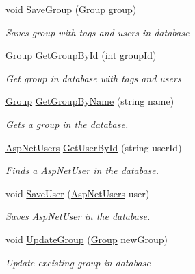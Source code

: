 \begin{DoxyCompactItemize}
void \hyperlink{class_website_1_1_models_1_1_quiz_model_acc5d338877e7da2f1f93008ba8d2e164}{Save\+Group} (\hyperlink{class_website_1_1_models_1_1_group}{Group} group)
\begin{DoxyCompactList}\small\item\em Saves group with tags and users in database \end{DoxyCompactList}\item 
\hyperlink{class_website_1_1_models_1_1_group}{Group} \hyperlink{class_website_1_1_models_1_1_quiz_model_a49fa02218c1a66bb6aaf0980fefffbc4}{Get\+Group\+By\+Id} (int group\+Id)
\begin{DoxyCompactList}\small\item\em Get group in database with tags and users \end{DoxyCompactList}\item 
\hyperlink{class_website_1_1_models_1_1_group}{Group} \hyperlink{class_website_1_1_models_1_1_quiz_model_a8ae086ab69c5576bb5b9963221d03d4c}{Get\+Group\+By\+Name} (string name)
\begin{DoxyCompactList}\small\item\em Gets a group in the database. \end{DoxyCompactList}\item 
\hyperlink{class_website_1_1_asp_net_users}{Asp\+Net\+Users} \hyperlink{class_website_1_1_models_1_1_quiz_model_ae8f40bf6c3557bb3b0a0e2fef8ec8277}{Get\+User\+By\+Id} (string user\+Id)
\begin{DoxyCompactList}\small\item\em Finds a Asp\+Net\+User in the database. \end{DoxyCompactList}\item 
void \hyperlink{class_website_1_1_models_1_1_quiz_model_aec9969ac7dd4892bf61a9ab5b884d97d}{Save\+User} (\hyperlink{class_website_1_1_asp_net_users}{Asp\+Net\+Users} user)
\begin{DoxyCompactList}\small\item\em Saves Asp\+Net\+User in the database. \end{DoxyCompactList}\item 
void \hyperlink{class_website_1_1_models_1_1_quiz_model_abb667e2c5dc64825fc9b8e6474d5481f}{Update\+Group} (\hyperlink{class_website_1_1_models_1_1_group}{Group} new\+Group)
\begin{DoxyCompactList}\small\item\em Update excisting group in database \end{DoxyCompactList}\item 

\end{DoxyCompactItemize}
